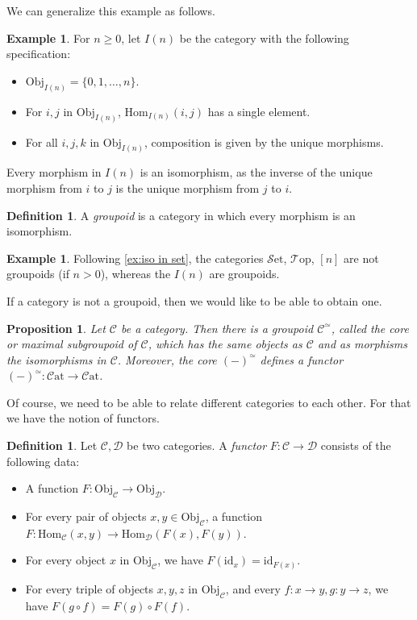 \documentclass[11pt, a4paper]{amsart}
\newcommand{\cC}{\mathcal{C}}
\newcommand{\cD}{\mathcal{D}}
\newcommand{\Hom}{\mathrm{Hom}}
\newcommand{\Set}{\mathscr{S}\mathrm{et}}
\newcommand{\Cat}{\mathscr{C}\mathrm{at}}
\newcommand{\Top}{\mathscr{T}\mathrm{op}}
\newcommand{\id}{\mathrm{id}}
\newcommand{\Obj}{\mathrm{Obj}}
\newtheorem{proposition}[equation]{Proposition}
\theoremstyle{definition}
\newtheorem{definition}[equation]{Definition}
\newtheorem{example}[equation]{Example}
\theoremstyle{remark}
\numberwithin{equation}{section}
\begin{document}
We can generalize this example as follows.

\begin{example}
For $n \geq 0$, let $I(n)$ be the category with the following specification:
\begin{itemize}
  \item $\Obj_{I(n)} = \{ 0, 1, \ldots, n \}$.
  \item For $i,j$ in $\Obj_{I(n)}$, $\Hom_{I(n)}(i,j)$ has a single element.
  \item For all $i,j,k$ in $\Obj_{I(n)}$, composition is given by the unique morphisms.
\end{itemize}
Every morphism in $I(n)$ is an isomorphism, as the inverse of the unique morphism from $i$ to $j$ is the unique morphism from $j$ to $i$. 
\end{example}

\begin{definition}
  A \emph{groupoid} is a category in which every morphism is an isomorphism.
\end{definition}

\begin{example} \label{ex:groupoids}
  Following \cref{ex:iso in set}, the categories $\Set$, $\Top$, $[n]$ are not groupoids (if $n > 0$), whereas the $I(n)$ are groupoids.
\end{example}

If a category is not a groupoid, then we would like to be able to obtain one.

\begin{proposition} \label{prop:core}
  Let $\cC$ be a category. Then there is a groupoid $\cC^{\simeq}$, called the \emph{core} or \emph{maximal subgroupoid} of $\cC$, which has the same objects as $\cC$ and as morphisms the isomorphisms in $\cC$. Moreover, the core $(-)^{\simeq}$ defines a functor $(-)^{\simeq}\colon \Cat \to \Cat$.
\end{proposition}

Of course, we need to be able to relate different categories to each other. For that we have the notion of functors.

\begin{definition}
	Let $\cC,\cD$ be two categories. A \emph{functor} $F\colon \cC \to \cD$ consists of the following data:
	\begin{itemize}
		\item A function $F\colon \Obj_{\cC} \to \Obj_{\cD}$.
		\item For every pair of objects $x,y \in	\Obj_{\cC}$, a function $F\colon \Hom_{\cC}(x,y) \to \Hom_{\cD}(F(x),F(y))$.
		\item For every object $x$ in $\Obj_{\cC}$, we	have $F(\id_x) = \id_{F(x)}$.
		\item	For every triple of objects $x,y,z$ in $\Obj_{\cC}$, and every $f\colon x \to y, g\colon y \to z$, we have $F(g \circ f) = F(g) \circ F(f)$.	
	\end{itemize}
\end{definition}
\end{document}

